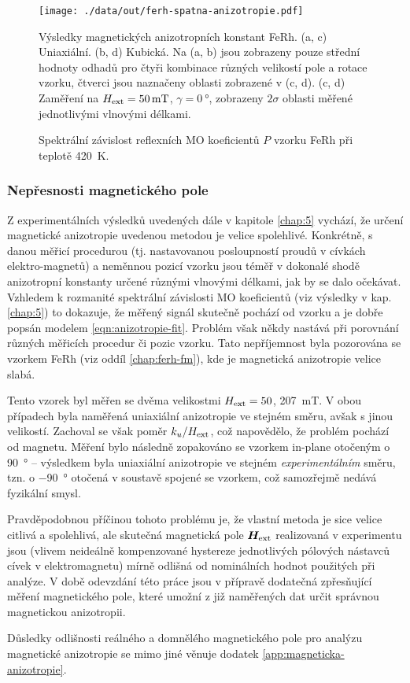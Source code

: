 \begin{figure}[htbp]
    \centering
    \texttt{[image: ./data/out/ferh-spatna-anizotropie.pdf]}
    \caption{Výsledky magnetických anizotropních konstant FeRh. (a, c) Uniaxiální. (b, d) Kubická. Na (a, b) jsou zobrazeny pouze střední hodnoty odhadů pro čtyři kombinace různých velikostí pole a rotace vzorku, čtverci jsou naznačeny oblasti zobrazené v (c, d). (c, d) Zaměření na $H_\textrm{ext}=\SI{50}{\milli\tesla}$, $\gamma=\SI{0}{\degree}$, zobrazeny $2\sigma$ oblasti měřené jednotlivými vlnovými délkami.}
    \label{fig:ferh-anizotropie}
\end{figure}

\begin{figure}[htbp]
    \centering
    \missingfigure{}
    \caption{Spektrální závislost reflexních MO koeficientů $P$ vzorku FeRh při teplotě \SI{420}{\kelvin}.}
    \label{fig:ferh-fm-pmld}
\end{figure}

\subsubsection{Nepřesnosti magnetického pole}

Z experimentálních výsledků uvedených dále v kapitole \ref{chap:5} vychází, že určení magnetické anizotropie uvedenou metodou je velice spolehlivé.
Konkrétně, s danou měřicí procedurou (tj. nastavovanou posloupností proudů v cívkách elektro-magnetů) a neměnnou pozicí vzorku jsou téměř v dokonalé shodě anizotropní konstanty určené různými vlnovými délkami, jak by se dalo očekávat.
Vzhledem k rozmanité spektrální závislosti MO koeficientů (viz výsledky v kap. \ref{chap:5}) to dokazuje, že měřený signál skutečně pochází od vzorku a je dobře popsán modelem \eqref{eqn:anizotropie-fit}.
Problém však někdy nastává při porovnání různých měřicích procedur či pozic vzorku.
Tato nepříjemnost byla pozorována se vzorkem FeRh (viz oddíl \ref{chap:ferh-fm}), kde je magnetická anizotropie velice slabá.

Tento vzorek byl měřen se dvěma velikostmi $H_\textrm{ext} = 50$, \SI{207}{\milli\tesla}.
V obou případech byla naměřená uniaxiální anizotropie ve stejném směru, avšak s jinou velikostí.
Zachoval se však poměr $k_u/H_\textrm{ext}$, což napovědělo, že problém pochází od magnetu.
Měření bylo následně zopakováno se vzorkem in-plane otočeným o \SI{90}{\degree} -- výsledkem byla uniaxiální anizotropie ve stejném \emph{experimentálním} směru, tzn. o \SI{-90}{\degree} otočená v soustavě spojené se vzorkem, což samozřejmě nedává fyzikální smysl.

Pravděpodobnou příčinou tohoto problému je, že vlastní metoda je sice velice citlivá a spolehlivá, ale skutečná magnetická pole $\bm{H}_\textrm{ext}$ realizovaná v experimentu jsou (vlivem neideálně kompenzované hystereze jednotlivých pólových nástavců cívek v elektromagnetu) mírně odlišná od nominálních hodnot použitých při analýze.
V době odevzdání této práce jsou v přípravě dodatečná zpřesňující měření magnetického pole, které umožní z již naměřených dat určit správnou magnetickou anizotropii.

Důsledky odlišnosti reálného a domnělého magnetického pole pro analýzu magnetické anizotropie se mimo jiné věnuje dodatek \ref{app:magneticka-anizotropie}.
